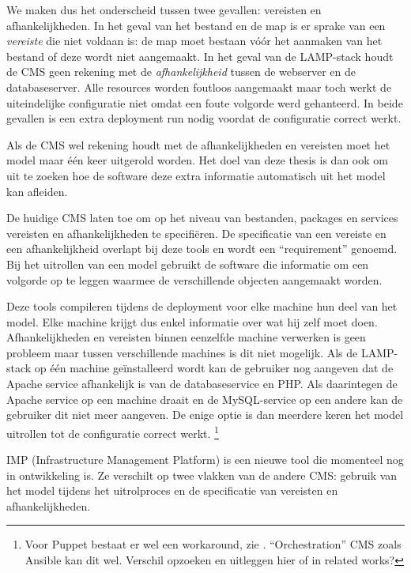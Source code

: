 We maken dus het onderscheid tussen twee gevallen: vereisten en afhankelijkheden.
In het geval van het bestand en de map is er sprake van een \textit{vereiste} die niet voldaan is: de map moet bestaan v\'o\'or het aanmaken van het bestand of deze wordt niet aangemaakt.
In het geval van de LAMP-stack houdt de CMS geen rekening met de \textit{afhankelijkheid} tussen de webserver en de databaseserver.
Alle resources worden foutloos aangemaakt maar toch werkt de uiteindelijke configuratie niet omdat een foute volgorde werd gehanteerd.
In beide gevallen is een extra deployment run nodig voordat de configuratie correct werkt.

Als de CMS wel rekening houdt met de afhankelijkheden en vereisten moet het model maar \'e\'en keer uitgerold worden.
Het doel van deze thesis is dan ook om uit te zoeken hoe de software deze extra informatie automatisch uit het model kan afleiden.

De huidige CMS laten toe om op het niveau van bestanden, packages en services vereisten en afhankelijkheden te specifi\"eren.
De specificatie van een vereiste en een afhankelijkheid overlapt bij deze tools en wordt een ``requirement'' genoemd.
Bij het uitrollen van een model gebruikt de software die informatie om een volgorde op te leggen waarmee de verschillende objecten aangemaakt worden.

Deze tools compileren tijdens de deployment voor elke machine hun deel van het model.
Elke machine krijgt dus enkel informatie over wat hij zelf moet doen.
Afhankelijkheden en vereisten binnen eenzelfde machine verwerken is geen probleem maar tussen verschillende machines is dit niet mogelijk.
Als de LAMP-stack op \'e\'en machine ge\"installeerd wordt kan de gebruiker nog aangeven dat de Apache service afhankelijk is van de databaseservice en PHP.
Als daarintegen de Apache service op een machine draait en de MySQL-service op een andere kan de gebruiker dit niet meer aangeven.
De enige optie is dan meerdere keren het model uitrollen tot de configuratie correct werkt.
\footnote{Voor Puppet bestaat er wel een workaround, zie \cite{puppet-orchestration}. ``Orchestration'' CMS zoals Ansible kan dit wel.  Verschil opzoeken en uitleggen hier of in related works?}

IMP (Infrastructure Management Platform) is een nieuwe tool die momenteel nog in ontwikkeling is.
Ze verschilt op twee vlakken van de andere CMS: gebruik van het model tijdens het uitrolproces en de specificatie van vereisten en afhankelijkheden.%

